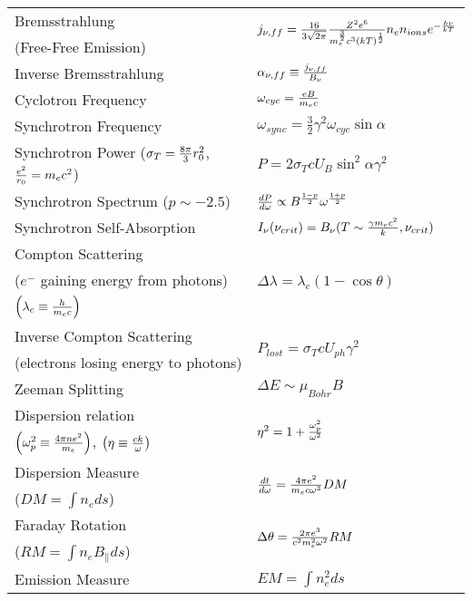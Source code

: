 \documentclass[10pt]{article}
\def\hf{\frac12}
\begin{document}
\begin{table}[h!]\begin{tabular}{|l|l|}

\hline
Bremsstrahlung & 
\multirow{2}{*}{$j_{\nu,ff}={16\over 3\sqrt{2\pi}}{Z^2e^6\over 
m_e^\frac32 c^3(kT)^\hf} n_e n_{ions} e^{-{h\nu\over kT}}$} \\
(Free-Free Emission) & \\

\hline
Inverse Bremsstrahlung &
$\alpha_{\nu,ff}\equiv{j_{\nu,ff}\over B_\nu}$ \\

\hline
Cyclotron Frequency &
$\omega_{cyc}={eB\over m_e c}$ \\

\hline
Synchrotron Frequency &
$\omega_{sync}=\frac32\gamma^2\omega_{cyc}\sin\alpha$ \\

\hline
Synchrotron Power ($\sigma_T={8\pi\over 3}r_0^2$, ${e^2\over r_0}=m_ec^2$) &
$P=2\sigma_T cU_B\sin^2\alpha\gamma^2$ \\

\hline
Synchrotron Spectrum ($p\sim-2.5$) &
${dP\over d\omega}\propto B^{1-p\over 2}\omega^{1+p\over 2}$ \\

\hline
Synchrotron Self-Absorption &
$I_\nu(\nu_{crit})=B_\nu(T\sim{\gamma m_ec^2\over k},\nu_{crit})$ \\

\hline
Compton Scattering & 
\multirow{3}{*}{$\Delta\lambda=\lambda_c(1-\cos\theta)$} \\
($e^-$ gaining energy from photons) & \\
$\left(\lambda_c\equiv {h\over m_e c}\right)$ & \\

\hline
Inverse Compton Scattering & 
\multirow{2}{*}{$P_{lost}=\sigma_T cU_{ph}\gamma^2$} \\
(electrons losing energy to photons) & \\

\hline
Zeeman Splitting &
$\Delta E\sim \mu_{Bohr} B$ \\

\hline
Dispersion relation & 
\multirow{2}{*}{$\eta^2=1+{\omega_p^2\over\omega^2}$} \\
$\left(\omega_p^2\equiv{4\pi ne^2\over m_e}\right)$,
$\left(\eta\equiv{ck\over\omega}\right)$ & \\

\hline
Dispersion Measure &
\multirow{2}{*}{${dt\over d\omega}={4\pi e^2\over m_ec\omega^3}DM$} \\
($DM=\int{n_e ds}$) & \\

\hline
Faraday Rotation & 
\multirow{2}{*}{$\Delta\theta={2\pi e^3\over c^2m_e^2\omega^2}RM$} \\
($RM=\int{n_eB_\|ds}$) & \\

\hline
Emission Measure &
$EM=\int{n_e^2 ds}$ \\

\hline
\end{tabular}\end{table}
\end{document}
